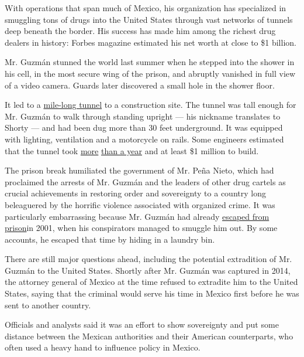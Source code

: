 With operations that span much of Mexico, his organization has
specialized in smuggling tons of drugs into the United States through
vast networks of tunnels deep beneath the border. His success has made
him among the richest drug dealers in history: Forbes magazine estimated
his net worth at close to \$1 billion.

Mr. Guzmán stunned the world last summer when he stepped into the shower
in his cell, in the most secure wing of the prison, and abruptly
vanished in full view of a video camera. Guards later discovered a small
hole in the shower floor.

It led to a
\href{https://news.vice.com/article/we\%2Dvisited\%2Dthe\%2Dend\%2Dof\%2Dthe\%2Dtunnel\%2Dwhere\%2Del\%2Dchapo\%2Dmade\%2Dhis\%2Dbrazen\%2Djailbreak?utm_source=vicenewstwitter}{mile-long
tunnel} to a construction site. The tunnel was tall enough for Mr.
Guzmán to walk through standing upright --- his nickname translates to
Shorty --- and had been dug more than 30 feet underground. It was
equipped with lighting, ventilation and a motorcycle on rails. Some
engineers estimated that the tunnel took
\href{http://www.nytimes.com/2015/07/17/world/americas/1-million-pricetag-hinted-in-el-chapos-escape.html}{more}
\href{http://www.nytimes.com/2015/07/17/world/americas/1-million-pricetag-hinted-in-el-chapos-escape.html}{than
a year} and at least \$1 million to build.

The prison break humiliated the government of Mr. Peña Nieto, which had
proclaimed the arrests of Mr. Guzmán and the leaders of other drug
cartels as crucial achievements in restoring order and sovereignty to a
country long beleaguered by the horrific violence associated with
organized crime. It was particularly embarrassing because Mr. Guzmán had
already
\href{http://www.nytimes.com/2001/01/29/world/mexican-jail-easy-to-flee-just-pay-up.html}{escaped
from prison}in 2001, when his conspirators managed to smuggle him out.
By some accounts, he escaped that time by hiding in a laundry bin.

There are still major questions ahead, including the potential
extradition of Mr. Guzmán to the United States. Shortly after Mr. Guzmán
was captured in 2014, the attorney general of Mexico at the time refused
to extradite him to the United States, saying that the criminal would
serve his time in Mexico first before he was sent to another country.

Officials and analysts said it was an effort to show sovereignty and put
some distance between the Mexican authorities and their American
counterparts, who often used a heavy hand to influence policy in Mexico.

